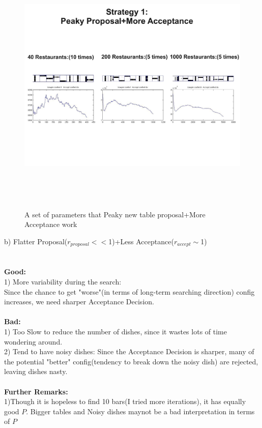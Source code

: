 \documentclass{article}
\begin{document}
\begin{spacing}{1.1}
\begin{figure}
 \centering
    \includegraphics[width=6in,height=5in]{strategy_2.pdf} 
    \caption{A set of parameters that Peaky new table proposal+More Acceptance work}
    \label{fig:by:table} 
\end{figure}
\newpage
b) Flatter Proposal($r_{proposal}<<$1)+Less Acceptance($r_{accept}\sim$1)\\ \\ \\
{\bf Good:}\\ 
1) More variability during the search:\\
Since the chance to get "worse"(in terms of long-term searching direction) config increases, we need sharper Acceptance Decision.\\ \\
{\bf Bad:}\\ 
1) Too Slow to reduce the number of dishes, since it wastes lots of time wondering around.\\
2) Tend to have noisy dishes: Since the Acceptance Decision is sharper, many of the potential "better" config(tendency to break down the noisy dish) are rejected,
leaving dishes nasty.\\ \\
{\bf Further Remarks:}\\ 
1)Though it is hopeless to find 10 bars(I tried more iterations), it has equally good $P$. Bigger tables and Noisy dishes maynot be a bad interpretation in terms of $P$\\

\end{spacing}
\end{document}
